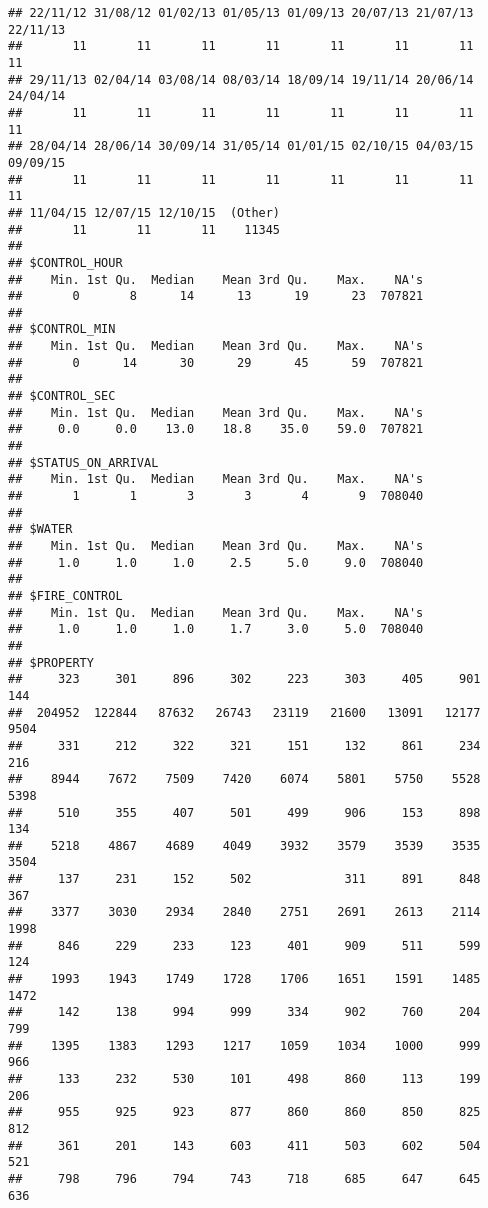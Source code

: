 \documentclass[]{article}
\begin{document}
\begin{verbatim}
## 22/11/12 31/08/12 01/02/13 01/05/13 01/09/13 20/07/13 21/07/13 22/11/13 
##       11       11       11       11       11       11       11       11 
## 29/11/13 02/04/14 03/08/14 08/03/14 18/09/14 19/11/14 20/06/14 24/04/14 
##       11       11       11       11       11       11       11       11 
## 28/04/14 28/06/14 30/09/14 31/05/14 01/01/15 02/10/15 04/03/15 09/09/15 
##       11       11       11       11       11       11       11       11 
## 11/04/15 12/07/15 12/10/15  (Other) 
##       11       11       11    11345 
## 
## $CONTROL_HOUR
##    Min. 1st Qu.  Median    Mean 3rd Qu.    Max.    NA's 
##       0       8      14      13      19      23  707821 
## 
## $CONTROL_MIN
##    Min. 1st Qu.  Median    Mean 3rd Qu.    Max.    NA's 
##       0      14      30      29      45      59  707821 
## 
## $CONTROL_SEC
##    Min. 1st Qu.  Median    Mean 3rd Qu.    Max.    NA's 
##     0.0     0.0    13.0    18.8    35.0    59.0  707821 
## 
## $STATUS_ON_ARRIVAL
##    Min. 1st Qu.  Median    Mean 3rd Qu.    Max.    NA's 
##       1       1       3       3       4       9  708040 
## 
## $WATER
##    Min. 1st Qu.  Median    Mean 3rd Qu.    Max.    NA's 
##     1.0     1.0     1.0     2.5     5.0     9.0  708040 
## 
## $FIRE_CONTROL
##    Min. 1st Qu.  Median    Mean 3rd Qu.    Max.    NA's 
##     1.0     1.0     1.0     1.7     3.0     5.0  708040 
## 
## $PROPERTY
##     323     301     896     302     223     303     405     901     144 
##  204952  122844   87632   26743   23119   21600   13091   12177    9504 
##     331     212     322     321     151     132     861     234     216 
##    8944    7672    7509    7420    6074    5801    5750    5528    5398 
##     510     355     407     501     499     906     153     898     134 
##    5218    4867    4689    4049    3932    3579    3539    3535    3504 
##     137     231     152     502             311     891     848     367 
##    3377    3030    2934    2840    2751    2691    2613    2114    1998 
##     846     229     233     123     401     909     511     599     124 
##    1993    1943    1749    1728    1706    1651    1591    1485    1472 
##     142     138     994     999     334     902     760     204     799 
##    1395    1383    1293    1217    1059    1034    1000     999     966 
##     133     232     530     101     498     860     113     199     206 
##     955     925     923     877     860     860     850     825     812 
##     361     201     143     603     411     503     602     504     521 
##     798     796     794     743     718     685     647     645     636 

\end{verbatim}
\end{document}
